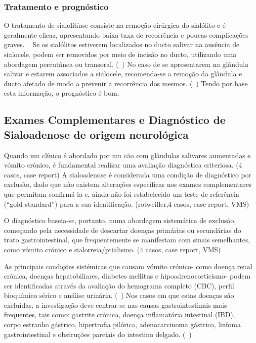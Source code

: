 \subsubsection{Tratamento e prognóstico}


O tratamento de sialolitíase consiste na remoção cirúrgica do sialólito e é geralmente eficaz, apresentando baixa taxa de recorrência e poucas complicações graves. ~\cite{Han2016,Ryan2008,perez-ecija_granulomatous_2012} Se os sialólitos estiverem localizados no ducto salivar na ausência de sialocele, podem ser removidos por meio de incisão no ducto, utilizando uma abordagem percutânea ou transoral. (~\cite{Han2016}) 
No caso de se apresentarem na glândula salivar e estarem associados a sialocele, recomenda-se a remoção da glândula e ducto afetado de modo a prevenir a recorrência dos mesmos. (~\cite{Han2016})
Tendo por base esta informação, o prognóstico é bom.


\subsection{Exames Complementares e Diagnóstico de Sialoadenose de origem neurológica}

Quando um clínico é abordado por um cão com glândulas salivares aumentadas e vómito crónico, é fundamental realizar uma avaliação diagnóstica criteriosa. (4 casos, case report) 
A sialoadenose é considerada uma condição de diagnóstico por exclusão, dado que não existem alterações específicas nos exames complementares que permitam confirmá-la e, ainda não foi estabelecido um teste de referência (“gold standard”) para a sua identificação. (rotweiller,4 casos, case report, VMS) 


O diagnóstico baseia-se, portanto, numa abordagem sistemática de exclusão, começando pela necessidade de descartar doenças primárias ou secundárias do trato gastrointestinal, que frequentemente se manifestam com sinais semelhantes, como vómito crónico e sialorreia/ptialismo. (4 casos, case report, VMS)


As principais condições sistémicas que causam vómito crónico- como doença renal crónica, doenças hepatobiliares, diabetes mellitus e hipoadrenocorticismo- podem ser identificadas através da avaliação do hemograma completo (CBC), perfil bioquímico sérico e análise urinária. (~\cite{Leib2010}) Nos casos em que estas doenças são excluídas, a investigação deve centrar-se nas causas gastrointestinais mais frequentes, tais como: gastrite crónica, doença inflamatória intestinal (IBD), corpo estranho gástrico, hipertrofia pilórica, adenocarcinoma gástrico, linfoma gastrointestinal e obstruções parciais do intestino delgado. (~\cite{Leib2010})


